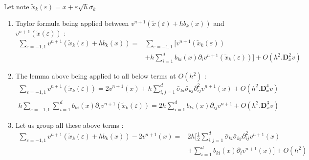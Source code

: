 \documentclass[a4paper,10pt]{article}
\begin{document}
Let  note $\tilde{x}_k(\varepsilon)=x +\varepsilon \sqrt{h}  \bar{\sigma_k}$ 
\begin{enumerate}
\item Taylor formula being applied between  $v^{n+1}(\tilde{x}(\varepsilon) + hb_k(x))$ and $v^{n+1}(\tilde{x}(\varepsilon))$ :
\begin{equation*}
\begin{split}
\sum_{\varepsilon={-1,1}} v^{n+1}(\tilde{x}_k(\varepsilon) + hb_k(x))=
&\sum_{\varepsilon={-1,1}} [v^{n+1}(\tilde{x}_k(\varepsilon)) \\
&+ h \sum_{i=1}^d b_{ki}(x)\partial_i v^{n+1}(\tilde{x}_k(\varepsilon))]
+ O(h^2.\textbf{D}^2_xv)
\end{split}
\end{equation*}

\item The lemma above being applied to all below terms at $O(h^2)$ : 
\begin{equation*}
\begin{array}{l}
\sum_{\varepsilon={-1,1}}v^{n+1}(\tilde{x}_k(\varepsilon)) 
=2v^{n+1}(x) + h\sum_{i,j=1}^d \bar{\sigma}_{ki}\bar{\sigma}_{kj}\partial^2_{ij}v^{n+1}(x) +O(h^2.\textbf{D}^4_xv) \\ \\
h \sum_{\varepsilon={-1,1}}\sum_{i=1}^d b_{ki}(x)\partial_i v^{n+1}(\tilde{x}_k(\varepsilon)) 
= 2h\sum_{i=1}^d b_{ki}(x)\partial_{ij} v^{n+1} + O(h^2.\textbf{D}^3_xv) 
\end{array}
\end{equation*}

\item Let us group all these above terms : 
\begin{equation*}
\begin{split}
\sum_{\varepsilon={-1,1}} v^{n+1}(\tilde{x}_k(\varepsilon) + hb_k(x))-2v^{n+1}(x)
=& 2h[\frac{1}{2}\sum_{i,j=1}^d \bar{\sigma}_{ki}\bar{\sigma}_{kj}\partial^2_{ij}v^{n+1}(x)
\\& 
+\sum_{i=1}^d b_{ki}(x)\partial_{i} v^{n+1}(x)] 
+ O(h^2)
\end{split}
\end{equation*}


\end{enumerate}
\end{document}

